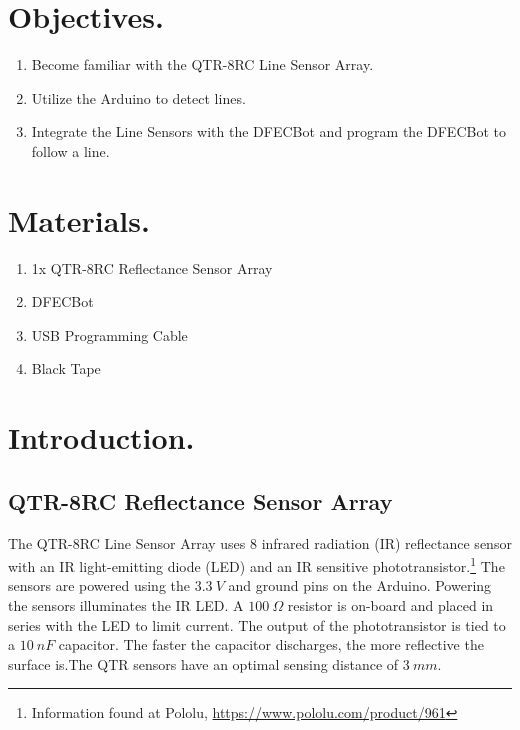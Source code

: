 \documentclass{handout}
\begin{document}
	\maketitle
	
	\section{Objectives.} 
	\begin{enumerate}
		\item Become familiar with the QTR-8RC Line Sensor Array.
		\item Utilize the Arduino to detect lines.
		\item Integrate the Line Sensors with the DFECBot and program the DFECBot to follow a line.
	\end{enumerate}
	
	\section{Materials.}
	\begin{enumerate}
		\item 1x QTR-8RC Reflectance Sensor Array
		\item DFECBot
		\item USB Programming Cable
		\item Black Tape
	\end{enumerate}
	
	\section{Introduction.}
	
	\subsection{QTR-8RC Reflectance Sensor Array}
	The QTR-8RC Line Sensor Array uses 8 infrared radiation (IR) reflectance sensor with an IR light-emitting diode (LED) and an IR sensitive phototransistor.\footnote{Information found at Pololu, \url{https://www.pololu.com/product/961}} The sensors are powered using the $3.3\ V$ and ground pins on the Arduino. Powering the sensors illuminates the IR LED. A $100\ \Omega$ resistor is on-board and placed in series with the LED to limit current. The output of the phototransistor is tied to a $10\ nF$ capacitor. The faster the capacitor discharges, the more reflective the surface is.\footnotemark[1] The QTR sensors have an optimal sensing distance of $3\ mm$.
	
\end{document}
